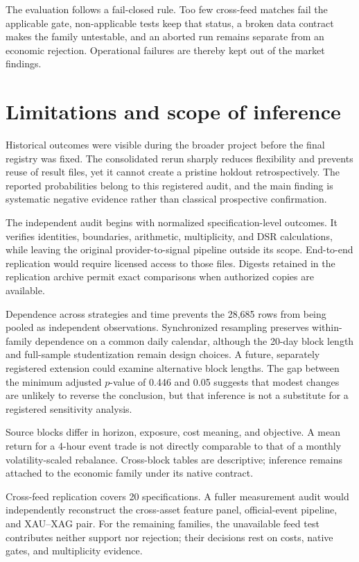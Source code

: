 The evaluation follows a fail-closed rule. Too few cross-feed matches fail the applicable gate, non-applicable tests keep that status, a broken data contract makes the family untestable, and an aborted run remains separate from an economic rejection. Operational failures are thereby kept out of the market findings.

\section{Limitations and scope of inference}\label{sec:limitations}

Historical outcomes were visible during the broader project before the final registry was fixed. The consolidated rerun sharply reduces flexibility and prevents reuse of result files, yet it cannot create a pristine holdout retrospectively. The reported probabilities belong to this registered audit, and the main finding is systematic negative evidence rather than classical prospective confirmation.

The independent audit begins with normalized specification-level outcomes. It verifies identities, boundaries, arithmetic, multiplicity, and DSR calculations, while leaving the original provider-to-signal pipeline outside its scope. End-to-end replication would require licensed access to those files. Digests retained in the replication archive permit exact comparisons when authorized copies are available.

Dependence across strategies and time prevents the 28,685 rows from being pooled as independent observations. Synchronized resampling preserves within-family dependence on a common daily calendar, although the 20-day block length and full-sample studentization remain design choices. A future, separately registered extension could examine alternative block lengths. The gap between the minimum adjusted $p$-value of 0.446 and 0.05 suggests that modest changes are unlikely to reverse the conclusion, but that inference is not a substitute for a registered sensitivity analysis.

Source blocks differ in horizon, exposure, cost meaning, and objective. A mean return for a 4-hour event trade is not directly comparable to that of a monthly volatility-scaled rebalance. Cross-block tables are descriptive; inference remains attached to the economic family under its native contract.

Cross-feed replication covers 20 specifications. A fuller measurement audit would independently reconstruct the cross-asset feature panel, official-event pipeline, and XAU--XAG pair. For the remaining families, the unavailable feed test contributes neither support nor rejection; their decisions rest on costs, native gates, and multiplicity evidence.

